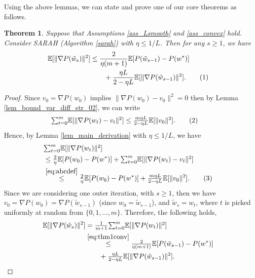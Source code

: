 \documentclass{article}
\newtheorem{thm}{Theorem}
\newcommand{\tc}[1]{\textcolor{Magenta}{\bf #1}}
\newcommand\tagthis{\addtocounter{equation}{1}\tag{\theequation}}
\begin{document}
Using  the above  lemmas, we can state and prove one of our core theorems as follows.
\begin{thm}\label{thm:generalconvex_01}
Suppose that Assumptions \ref{ass_Lsmooth} and \ref{ass_convex} hold. Consider  SARAH (Algorithm \ref{sarah}) with $\eta \leq 1/L$. Then  for any $s\geq 1$, we have 
\begin{align*}
\mathbb{E}[ \| \nabla P(\tilde{w}_s)\|^2 ] 
&\leq \frac{2}{\eta (m + 1)} \mathbb{E}[ P(\tilde w_{s-1}) - P(w^{*})]  
\\ %
&\qquad + \frac{ \eta L}{2 - \eta L}  \mathbb{E}[ \| \nabla P(\tilde w_{s-1})\|^2 ]. \tagthis \label{eq:agasgsasw}
\end{align*}
\end{thm}
\begin{proof}
Since $v_0=\nabla P(w_0)$ implies $\| \nabla P(w_{0}) - v_{0} \|^2 = 0$ then by Lemma \ref{lem_bound_var_diff_str_02}, we can write
\begin{align*}
& \textstyle{\sum}_{t=0}^{m} \mathbb{E}[ \| \nabla P(w_{t}) - v_{t} \|^2 ] 
 \leq  \frac{m\eta L}{2 - \eta L} \mathbb{E}[ \|v_{0} \|^2]. \tagthis \label{eq:abcdef}
\end{align*}
Hence, by Lemma \ref{lem_main_derivation} with $\eta\leq 1/L$, we have
\begin{align*}
& \textstyle{\sum}_{t=0}^{m} \mathbb{E}[ \| \nabla P(w_{t})\|^2 ]  \\
 & \leq \tfrac{2}{\eta} \mathbb{E}[ P(w_{0}) - P(w^{*})] + \textstyle{\sum}_{t=0}^{m} \mathbb{E}[ \| \nabla P(w_{t}) - v_{t} \|^2 ] 
 \\%
& \overset{\eqref{eq:abcdef}}{\leq} \tfrac{2}{\eta} \mathbb{E}[ P(w_{0}) - P(w^{*})]  + \tfrac{m\eta L}{2 - \eta L} \mathbb{E}[ \| v_{0} \|^2 ]. \tagthis\label{eq:thm1conv}
\end{align*}
Since we are considering one outer iteration, with $s\geq 1$, then we have $v_0 = \nabla P(w_0) = \nabla P(\tilde w_{s-1})$ (since $w_0 =\tilde{w}_{s-1}$), and $\tilde{w}_s = w_t$, where $t$ is picked uniformly at random from $\{0,1,\dots,m\}$. Therefore, the following holds,
\begin{align*}
\mathbb{E}[ \| \nabla P(\tilde{w}_s)\|^2 ] &= \tfrac{1}{m+1}\textstyle{\sum}_{t=0}^{m} \mathbb{E}[ \| \nabla P(w_{t})\|^2 ]
 \\%
&\overset{\eqref{eq:thm1conv}}{\leq} \tfrac{2}{\eta (m + 1)} \mathbb{E}[ P(\tilde w_{s-1}) - P(w^{*})]  
\\ %
&\qquad + \tfrac{ \eta L}{2 - \eta L}  \mathbb{E}[ \| \nabla P(\tilde w_{s-1})\|^2 ]. \qedhere 
\end{align*}
\end{proof}
\end{document}

